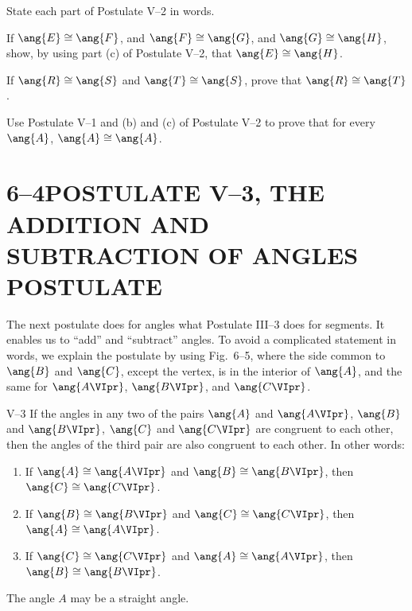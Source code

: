 \documentclass[11pt]{book}
\theoremstyle{bkplain}
\theoremstyle{XIplainnote}
\theoremstyle{bkplain}
\theoremstyle{bkplain}
\begin{document}
\begin{exercisecols}
\begin{exlist}
\item State each part of Postulate V--2 in words.
\item If $\ang{E} \cong \ang{F}$, and $\ang{F} \cong \ang{G}$, and
  $\ang{G} \cong \ang{H}$, show, by using part (c) of Postulate V--2, that
  $\ang{E} \cong \ang{H}$.
\item If $\ang{R} \cong \ang{S}$ and $\ang{T} \cong \ang{S}$, prove that
  $\ang{R} \cong \ang{T}$.
\item[\stex 4.] Use Postulate V--1 and (b) and (c) of Postulate V--2 to prove
  that for every $\ang{A}$, $\ang{A} \cong \ang{A}$.
\end{exlist}
\end{exercisecols}

\section*{6--4\quad POSTULATE V--3, THE ADDITION AND SUBTRACTION OF ANGLES POSTULATE}

The next postulate does for angles what Postulate III--3 does for segments. It
enables us to ``add'' and ``subtract'' angles. To avoid a complicated statement
in words, we explain the postulate by using Fig.~6--5, where the side common to
$\ang{B}$ and $\ang{C}$, except the vertex, is in the interior of $\ang{A}$,
and the same for $\ang{A\VIpr}$, $\ang{B\VIpr}$, and $\ang{C\VIpr}$.

\FIGVIFIVE

\medskip
\noindent
V--3 If the angles in any two of the pairs $\ang{A}$ and $\ang{A\VIpr}$,
$\ang{B}$ and $\ang{B\VIpr}$, $\ang{C}$ and $\ang{C\VIpr}$ are congruent to
each other, then the angles of the third pair are also congruent to each other.
In other words:
\begin{enumerate}[label=(\alph*), leftmargin=2.6em, itemsep=1pt, topsep=3pt]
\item If $\ang{A} \cong \ang{A\VIpr}$ and $\ang{B} \cong \ang{B\VIpr}$, then
  $\ang{C} \cong \ang{C\VIpr}$.
\item If $\ang{B} \cong \ang{B\VIpr}$ and $\ang{C} \cong \ang{C\VIpr}$, then
  $\ang{A} \cong \ang{A\VIpr}$.
\item If $\ang{C} \cong \ang{C\VIpr}$ and $\ang{A} \cong \ang{A\VIpr}$, then
  $\ang{B} \cong \ang{B\VIpr}$.
\end{enumerate}
\noindent The angle $A$ may be a straight angle.
\medskip
\end{document}
